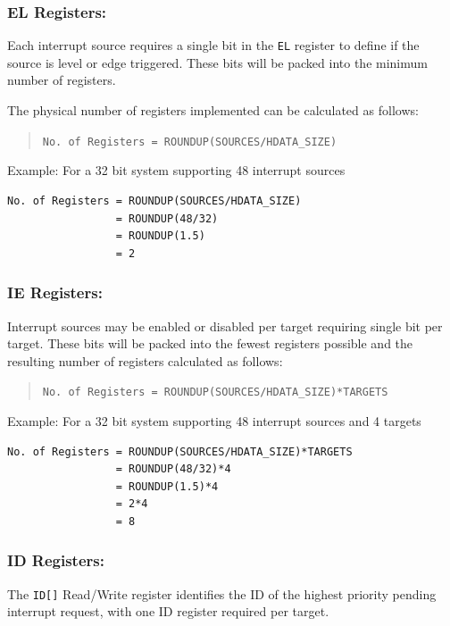 \subsubsection{EL Registers:}

Each interrupt source requires a single bit in the \texttt{EL} register to define if the source is level or edge triggered.
These bits will be packed into the minimum number of registers.

The physical number of registers implemented can be calculated as follows:

\begin{quote}
\texttt{No.\ of\ Registers\ =\ ROUNDUP(SOURCES/HDATA\_SIZE)}
\end{quote}

Example: For a 32 bit system supporting 48 interrupt sources

\begin{verbatim}
No. of Registers = ROUNDUP(SOURCES/HDATA_SIZE)   
                 = ROUNDUP(48/32)
                 = ROUNDUP(1.5)
                 = 2
\end{verbatim}

\subsubsection{IE Registers:}

Interrupt sources may be enabled or disabled per target requiring single bit per target.
These bits will be packed into the fewest registers possible and the resulting number of registers calculated as follows:

\begin{quote}
\texttt{No.\ of\ Registers\ =\ ROUNDUP(SOURCES/HDATA\_SIZE)*TARGETS}
\end{quote}

Example: For a 32 bit system supporting 48 interrupt sources and 4 targets

\begin{verbatim}
No. of Registers = ROUNDUP(SOURCES/HDATA_SIZE)*TARGETS
                 = ROUNDUP(48/32)*4
                 = ROUNDUP(1.5)*4
                 = 2*4
                 = 8
\end{verbatim}

\subsubsection{ID Registers:}

The \texttt{ID[]} Read/Write register identifies the ID of the highest priority pending interrupt request, with one ID register required per target.


